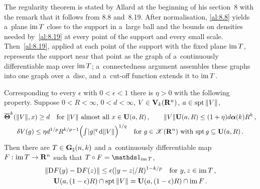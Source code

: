 \begin{miniremark}
    \label{mr:8.RT}
    The regularity theorem is stated by Allard at the beginning of his section~8 with the remark
    that it follows from 8.8 and~8.19. After normalisation, \ref{al:8.8} yields a~plane $\operatorname{im} T$
    close to the support in a~large ball and the bounds on densities needed by~\ref{al:8.19}
    at every point of the support and every small scale. Then~\ref{al:8.19}, applied at each point
    of the support with the fixed plane $\operatorname{im} T$, represents the support near that point as the graph
    of a~continuously differentiable map over $\operatorname{im} T$; a~connectedness argument assembles these
    graphs into one graph over a~disc, and a~cut-off function extends it to $\operatorname{im} T$.
\end{miniremark}

\begin{theorem}
    \label{al:8.RT}
    Corresponding to every $\epsilon$ with $0 < \epsilon < 1$ there is $\eta > 0$ with the
    following property. Suppose $0 < R < \infty$, $0 < d < \infty$, $V \in \mathbf{V}_{k}(\mathbf{R}^{n})$, $a
    \in \operatorname{spt} \|V\|$,
    \begin{gather*}
        \boldsymbol{\overline{\Theta}}^{k}(\|V\|,x) \ge d \quad \text{for $\|V\|$ almost all $x \in \mathbf{U}(a,R)$}
        \,, \qquad \|V\| \mathbf{U}(a,R) \le (1 + \eta) d \boldsymbol{\alpha}(k) R^{k} \,, \\
        \delta V(g) \le \eta d^{1/p} R^{k/p - 1} \Big( {\textstyle\int_{}^{}} |g|^q \,\mathrm{d} \|V\| \Big)^{1/q}
        \quad \text{for $g \in \mathscr{X}(\mathbf{R}^{n})$ with $\operatorname{spt} g \subseteq \mathbf{U}(a,R)$} \,.
    \end{gather*}
    Then there are $T \in \mathbf{G}_{\natural}(n,k)$ and a~continuously differentiable map $F : \operatorname{im} T
    \to \mathbf{R}^{n}$ such that $T \circ F = \id{\im T}$,
    \begin{gather*}
        \|\mathrm{D} F(y) - \mathrm{D} F(z)\| \le \epsilon (|y - z|/R)^{1 - k/p} \quad \text{for $y, z \in \operatorname{im}
        T$} \,, \\
        \mathbf{U}(a,(1 - \epsilon) R) \cap \operatorname{spt} \|V\| = \mathbf{U}(a,(1 - \epsilon) R) \cap \operatorname{im} F \,.
    \end{gather*}
\end{theorem}

